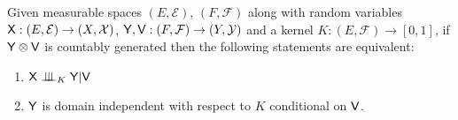 \begin{theorem}\label{th:univ_dom_cond_equiv}
Given measurable spaces $(E,\mathcal{E})$, $(F,\mathcal{F})$ along with random variables $\mathsf{X}:(E,\mathcal{E})\to (X,\mathcal{X})$, $\mathsf{Y},\mathsf{V}:(F,\mathcal{F})\to (Y,\mathcal{Y})$ and a kernel $K:(E,\mathcal{F})\to [0,1]$, if $\mathsf{Y}\otimes \mathsf{V}$ is countably generated then the following statements are equivalent:
\begin{enumerate}
    \item $\RV{X}\CII_K\RV{Y}|\RV{V}$
    \item $\mathsf{Y}$ is domain independent with respect to $K$ conditional on $\mathsf{V}$.
\end{enumerate}

\end{theorem}

